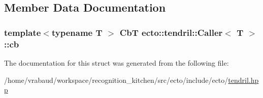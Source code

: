 \subsection{Member Data Documentation}
\subsubsection[{\texorpdfstring{cb}{cb}}]{\setlength{\rightskip}{0pt plus 5cm}template$<$typename T $>$ {\bf CbT} {\bf ecto\+::tendril\+::\+Caller}$<$ T $>$\+::cb}\hypertarget{structecto_1_1tendril_1_1Caller_afecdbc09ca504c16292a6365ab1cd950}{}\label{structecto_1_1tendril_1_1Caller_afecdbc09ca504c16292a6365ab1cd950}


The documentation for this struct was generated from the following file\+:\begin{DoxyCompactItemize}
\item 
/home/vrabaud/workspace/recognition\+\_\+kitchen/src/ecto/include/ecto/\hyperlink{tendril_8hpp}{tendril.\+hpp}\end{DoxyCompactItemize}
